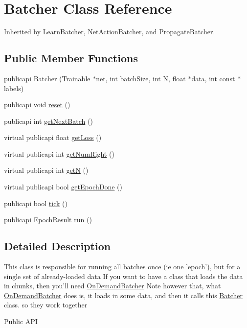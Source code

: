 \hypertarget{classBatcher}{\section{Batcher Class Reference}
\label{classBatcher}
}


Inherited by Learn\-Batcher, Net\-Action\-Batcher, and Propagate\-Batcher.

\subsection*{Public Member Functions}
\begin{DoxyCompactItemize}
\item 
publicapi \hyperlink{classBatcher_a4a53928e1ea4f752953ea43ab7faa0e8}{Batcher} (Trainable $\ast$net, int batch\-Size, int N, float $\ast$data, int const $\ast$labels)
\item 
publicapi void \hyperlink{classBatcher_a0f3c13ade8b4840d87a43167a7341070}{reset} ()
\item 
publicapi int \hyperlink{classBatcher_ab26dca3a4d002664f0a13c68ddc65ced}{get\-Next\-Batch} ()
\item 
virtual publicapi float \hyperlink{classBatcher_afaafa92c67a361127079ba8b3003e0f2}{get\-Loss} ()
\item 
virtual publicapi int \hyperlink{classBatcher_a5426a711b8a6989f57fa1c6dad2e1138}{get\-Num\-Right} ()
\item 
virtual publicapi int \hyperlink{classBatcher_ae1bcb776d55a399fc91ef70b43b753d5}{get\-N} ()
\item 
virtual publicapi bool \hyperlink{classBatcher_a9f71c218e242b55bcd490379cc20e7ac}{get\-Epoch\-Done} ()
\item 
publicapi bool \hyperlink{classBatcher_afb1f812a7b9b3e45ae57d235c912d754}{tick} ()
\item 
publicapi Epoch\-Result \hyperlink{classBatcher_a51d5f36d326bdc32926abd8aa5b0d22e}{run} ()
\end{DoxyCompactItemize}


\subsection{Detailed Description}
This class is responsible for running all batches once (ie one 'epoch'), but for a single set of already-\/loaded data If you want to have a class that loads the data in chunks, then you'll need \hyperlink{classOnDemandBatcher}{On\-Demand\-Batcher} Note however that, what \hyperlink{classOnDemandBatcher}{On\-Demand\-Batcher} does is, it loads in some data, and then it calls this \hyperlink{classBatcher}{Batcher} class. so they work together \begin{DoxyParagraph}{Public A\-P\-I}

\end{DoxyParagraph}


